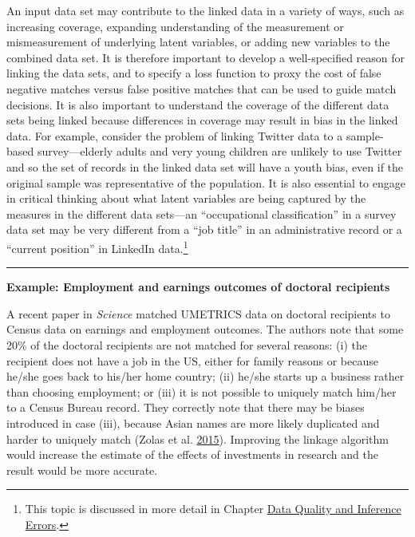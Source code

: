 \documentclass[]{krantz}
\begin{document}
An input data set may contribute to the linked data in a variety of
ways, such as increasing coverage, expanding understanding of the
measurement or mismeasurement of underlying latent variables, or adding
new variables to the combined data set. It is therefore important to
develop a well-specified reason for linking the data sets, and to
specify a loss function to proxy the cost of false negative matches
versus false positive matches that can be used to guide match decisions.
It is also important to understand the coverage of the different data
sets being linked because differences in coverage may result in bias in
the linked data. For example, consider the problem of linking Twitter
data to a sample-based survey---elderly adults and very young children
are unlikely to use Twitter and so the set of records in the linked data
set will have a youth bias, even if the original sample was
representative of the population. It is also essential to engage in
critical thinking about what latent variables are being captured by the
measures in the different data sets---an ``occupational classification''
in a survey data set may be very different from a ``job title'' in an
administrative record or a ``current position'' in LinkedIn
data.\footnote{This topic is discussed in more detail in Chapter
  \protect\hyperlink{chap:errors}{Data Quality and Inference Errors}.}

\begin{center}\rule{0.5\linewidth}{\linethickness}\end{center}

\textbf{Example: Employment and earnings outcomes of doctoral
recipients}

A recent paper in \emph{Science} matched UMETRICS data on doctoral
recipients to Census data on earnings and employment outcomes. The
authors note that some 20\% of the doctoral recipients are not matched
for several reasons: (i) the recipient does not have a job in the US,
either for family reasons or because he/she goes back to his/her home
country; (ii) he/she starts up a business rather than choosing
employment; or (iii) it is not possible to uniquely match him/her to a
Census Bureau record. They correctly note that there may be biases
introduced in case (iii), because Asian names are more likely duplicated
and harder to uniquely match (Zolas et al.
\protect\hyperlink{ref-zolas2015wrapping}{2015}). Improving the linkage
algorithm would increase the estimate of the effects of investments in
research and the result would be more accurate.
\end{document}
